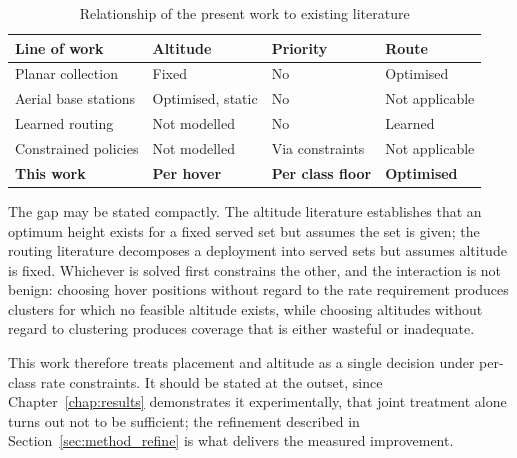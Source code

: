 \begin{table}[!ht]
\centering
\caption{Relationship of the present work to existing literature}
\label{tab:gap}
\begin{tabular}{p{4.4cm}p{3.0cm}p{2.2cm}p{2.4cm}}
\toprule
\textbf{Line of work} & \textbf{Altitude} & \textbf{Priority} & \textbf{Route} \\
\midrule
Planar collection \cite{zhan2018energy,yang2018energy} & Fixed & No & Optimised \\
Aerial base stations \cite{alhourani2014optimal,mozaffari2017mobile} & Optimised, static & No & Not applicable \\
Learned routing \cite{kool2019attention,nazari2018reinforcement} & Not modelled & No & Learned \\
Constrained policies \cite{altman1999constrained,achiam2017constrained} & Not modelled & Via constraints & Not applicable \\
\midrule
\textbf{This work} & \textbf{Per hover} & \textbf{Per class floor} & \textbf{Optimised} \\
\bottomrule
\end{tabular}
\end{table}

The gap may be stated compactly. The altitude literature establishes that an optimum height exists for a fixed served set but assumes the set is given; the routing literature decomposes a deployment into served sets but assumes altitude is fixed. Whichever is solved first constrains the other, and the interaction is not benign: choosing hover positions without regard to the rate requirement produces clusters for which no feasible altitude exists, while choosing altitudes without regard to clustering produces coverage that is either wasteful or inadequate.

This work therefore treats placement and altitude as a single decision under per-class rate constraints. It should be stated at the outset, since Chapter~\ref{chap:results} demonstrates it experimentally, that joint treatment alone turns out not to be sufficient; the refinement described in Section~\ref{sec:method_refine} is what delivers the measured improvement.

